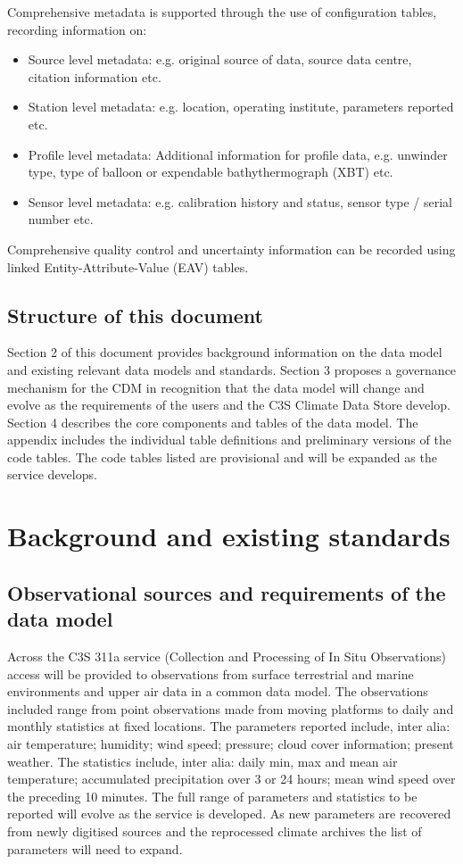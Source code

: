 \documentclass[a4paper,12pt]{article}
\begin{document}
Comprehensive metadata is supported through the use of configuration tables, recording information on:
\begin{itemize}
\item Source level metadata: e.g. original source of data, source data centre, citation information etc.
\item Station level metadata: e.g. location, operating institute, parameters reported etc.
\item Profile level metadata: Additional information for profile data, e.g. unwinder type, type of balloon or expendable bathythermograph (XBT) etc.
\item Sensor level metadata: e.g. calibration history and status, sensor type / serial number etc.
\end{itemize}
Comprehensive quality control and uncertainty information can be recorded using linked Entity-Attribute-Value (EAV) tables.

\subsection {Structure of this document}

Section 2 of this document provides background information on the data model and existing relevant data models and standards. Section 3 proposes a governance mechanism for the CDM in recognition that the data model will change and evolve as the requirements of the users and the C3S Climate Data Store develop. Section 4 describes the core components and tables of the data model. The appendix includes the individual table definitions and preliminary versions of the code tables. The code tables listed are provisional and will be expanded as the service develops.

\section {Background and existing standards}
\subsection {Observational sources and requirements of the data model}

Across the C3S 311a service (Collection and Processing of In Situ Observations) access will be provided to observations from surface terrestrial and marine environments and upper air data in a common data model. The observations included range from point observations made from moving platforms to daily and monthly statistics at fixed locations. The parameters reported include, inter alia: air temperature; humidity; wind speed; pressure; cloud cover information; present weather. The statistics include, inter alia: daily min, max and mean air temperature; accumulated precipitation over 3 or 24 hours; mean wind speed over the preceding 10 minutes. The full range of parameters and statistics to be reported will evolve as the service is developed. As new parameters are recovered from newly digitised sources and the reprocessed climate archives the list of parameters will need to expand.\\
\end{document}
